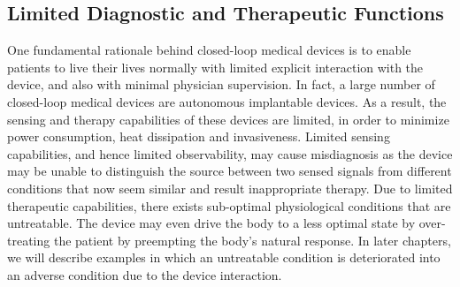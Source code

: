 \subsection{Limited Diagnostic and Therapeutic Functions}
One fundamental rationale behind closed-loop medical devices is to enable patients to live their  lives normally with limited explicit interaction with the device, and also with minimal physician supervision. In fact, a large number of closed-loop medical devices are autonomous implantable devices. As a result, the sensing and therapy capabilities of these devices are limited, in order to minimize power consumption, heat dissipation and invasiveness. Limited sensing capabilities, and hence limited observability, may cause misdiagnosis as the device may be unable to distinguish the source between two sensed signals from different conditions that now seem similar and result inappropriate therapy. Due to limited therapeutic capabilities, there exists sub-optimal physiological conditions that are untreatable. The device may even drive the body to a less optimal state by over-treating the patient by preempting the body's natural response. In later chapters, we will describe examples in which an untreatable condition is deteriorated into an adverse condition due to the device interaction.

